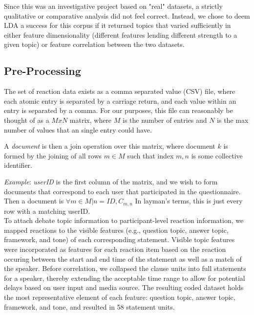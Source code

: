 Since this was an investigative project based on "real" datasets, a strictly qualitative or comparative analysis did not feel correct. Instead, we chose to deem LDA a success for this corpus if it returned topics that varied sufficiently in either feature dimensionality (different features lending different strength to a given topic) or feature correlation between the two datasets.

\subsection{Pre-Processing}
The set of reaction data exists as a comma separated value (CSV) file, where each atomic entry is separated by a carriage return, and each value within an entry is separated by a comma. For our purposes, this file can reasonably be thought of as a $MxN$ matrix, where $M$ is the number of entries and $N$ is the max number of values that an single entry could have.

A \emph{document} is then a join operation over this matrix, where document $k$ is formed by the joining of all rows $m \in M$ such that index $m,n$ is some collective identifier.

\emph{Example}: \emph{userID} is the first column of the matrix, and we wish to form documents that correspond to each user that participated in the questionnaire. Then a document is $\forall m \in M | n = ID ,C_{m,n}$ In layman's terms, this is just every row with a matching userID.\\

To attach debate topic information to participant-level reaction information, we mapped reactions to the visible features (e.g., question topic, answer topic, framework, and tone) of each corresponding statement.  Visible topic features were incorporated as features for each reaction item based on the reaction occuring between the start and end time of the statement as well as a match of the speaker.   Before correlation,  we collapsed the clause units into full statements for a speaker, thereby extending the acceptable time range to allow for potential delays based on user input and media source.  The resulting coded dataset holds the most representative element of each feature: question topic, answer topic, framework, and tone, and resulted in 58 statement units.
